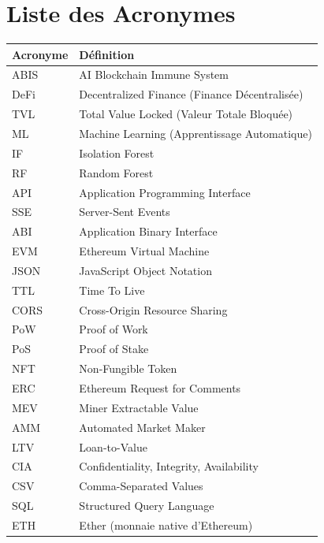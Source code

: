 \documentclass[12pt,a4paper]{report}
\begin{document}
\newpage
\chapter*{Liste des Acronymes}

\begin{tabular}{L{3cm} L{10cm}}
\toprule
\textbf{Acronyme} & \textbf{Définition} \\
\midrule
ABIS   & AI Blockchain Immune System \\
DeFi   & Decentralized Finance (Finance Décentralisée) \\
TVL    & Total Value Locked (Valeur Totale Bloquée) \\
ML     & Machine Learning (Apprentissage Automatique) \\
IF     & Isolation Forest \\
RF     & Random Forest \\
API    & Application Programming Interface \\
SSE    & Server-Sent Events \\
ABI    & Application Binary Interface \\
EVM    & Ethereum Virtual Machine \\
JSON   & JavaScript Object Notation \\
TTL    & Time To Live \\
CORS   & Cross-Origin Resource Sharing \\
PoW    & Proof of Work \\
PoS    & Proof of Stake \\
NFT    & Non-Fungible Token \\
ERC    & Ethereum Request for Comments \\
MEV    & Miner Extractable Value \\
AMM    & Automated Market Maker \\
LTV    & Loan-to-Value \\
CIA    & Confidentiality, Integrity, Availability \\
CSV    & Comma-Separated Values \\
SQL    & Structured Query Language \\
ETH    & Ether (monnaie native d'Ethereum) \\
\bottomrule
\end{tabular}

\newpage
{}
\setcounter{page}{1}
\end{document}
